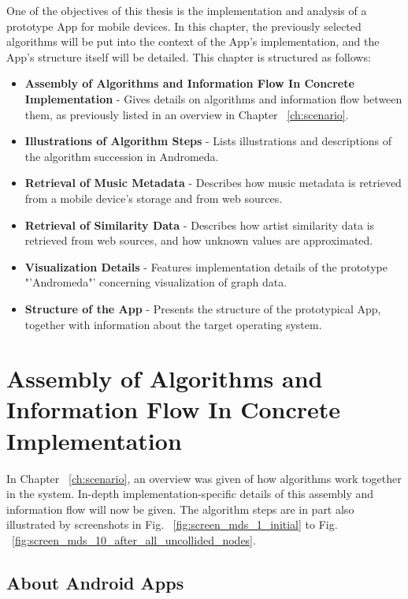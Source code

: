 One of the objectives of this thesis is the implementation and analysis of a prototype App for mobile devices. In this chapter, the previously selected algorithms will be put into the context of the App's implementation, and the App's structure itself will be detailed. This chapter is structured as follows:

\begin{itemize}
	\item \textbf {Assembly of Algorithms and Information Flow In Concrete Implementation} - Gives details on algorithms and information flow between them, as previously listed in an overview in Chapter ~\ref{ch:scenario}.
	\item \textbf {Illustrations of Algorithm Steps} - Lists illustrations and descriptions of the algorithm succession in Andromeda.
	\item \textbf {Retrieval of Music Metadata} - Describes how music metadata is retrieved from a mobile device's storage and from web sources.
	\item \textbf {Retrieval of Similarity Data} - Describes how artist similarity data is retrieved from web sources, and how unknown values are approximated.
	\item \textbf {Visualization Details} - Features implementation details of the prototype "'Andromeda"' concerning visualization of graph data.
	\item \textbf {Structure of the App} - Presents the structure of the prototypical App, together with information about the target operating system.
\end{itemize}

\section{Assembly of Algorithms and Information Flow In Concrete Implementation}
\label{sec:algorithm-assembly}

In Chapter ~\ref{ch:scenario}, an overview was given of how algorithms work together in the system. In-depth implementation-specific details of this assembly and information flow will now be given. The algorithm steps are in part also illustrated by screenshots in Fig. ~\ref{fig:screen_mds_1_initial} to Fig. ~\ref{fig:screen_mds_10_after_all_uncollided_nodes}.

\subsection{About Android Apps}

